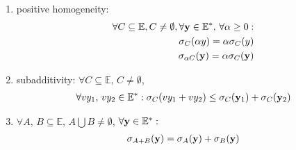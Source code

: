 \documentclass[11pt]{article}
\begin{document}
\begin{proposition}
    \begin{enumerate}
        \item positive homogeneity:
        \begin{align*}
            \forall C \subseteq \mathbb{E}, C \neq \emptyset, \forall {\mathbf{y}} \in \mathbb{E}^{*},\,
            \forall  \alpha \ge 0:\\
            \sigma_{C}(\alpha y) = \alpha \sigma_{C}(y)\\
            \sigma_{\alpha C}({\mathbf{y}}) = \alpha \sigma_{C}({\mathbf{y}})
        \end{align*}
        \item subadditivity: $\forall C \subseteq \mathbb{E}, \, C \neq \emptyset$,
        \begin{align*}
            \forall vy_1,\,vy_2 \in \mathbb{E}^{*}: \sigma_{C}(vy_1+vy_2) \le \sigma_{C}({\mathbf{y}}_1) +
            \sigma_{C}({\mathbf{y}}_2)
        \end{align*}
        \item $\forall A,\,B \subseteq  \mathbb{E}$, $A \bigcup B \neq \emptyset$, $\forall {\mathbf{y}} \in
        \mathbb{E}^{*}:$
        \begin{align*}
            \sigma_{A+B}({\mathbf{y}}) = \sigma_{A}({\mathbf{y}}) + \sigma_{B}({\mathbf{y}})
        \end{align*}
    \end{enumerate}
\end{proposition}
\end{document}
